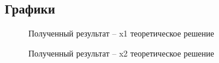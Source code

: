\documentclass[12pt]{article}
\begin{document}
 	\subsection{Графики}
 	\begin{figure}[h]
 		\caption{Полученный результат -- x1 теоретическое решение}
 	\end{figure}
 \begin{figure}[h]
 	\caption{Полученный результат -- x2 теоретическое решение}
 \end{figure}
\end{document}

